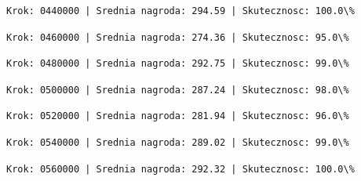 \documentclass[11pt]{article}
\begin{document}
    
    
    \begin{Verbatim}[commandchars=\\\{\}]
Krok: 0440000 | Srednia nagroda: 294.59 | Skutecznosc: 100.0\%

    \end{Verbatim}

    
    
    \begin{Verbatim}[commandchars=\\\{\}]
Krok: 0460000 | Srednia nagroda: 274.36 | Skutecznosc: 95.0\%

    \end{Verbatim}

    
    
    \begin{Verbatim}[commandchars=\\\{\}]
Krok: 0480000 | Srednia nagroda: 292.75 | Skutecznosc: 99.0\%

    \end{Verbatim}

    
    
    \begin{Verbatim}[commandchars=\\\{\}]
Krok: 0500000 | Srednia nagroda: 287.24 | Skutecznosc: 98.0\%

    \end{Verbatim}

    
    
    \begin{Verbatim}[commandchars=\\\{\}]
Krok: 0520000 | Srednia nagroda: 281.94 | Skutecznosc: 96.0\%

    \end{Verbatim}

    
    
    \begin{Verbatim}[commandchars=\\\{\}]
Krok: 0540000 | Srednia nagroda: 289.02 | Skutecznosc: 99.0\%

    \end{Verbatim}

    
    
    \begin{Verbatim}[commandchars=\\\{\}]
Krok: 0560000 | Srednia nagroda: 292.32 | Skutecznosc: 100.0\%

    \end{Verbatim}
\end{document}
